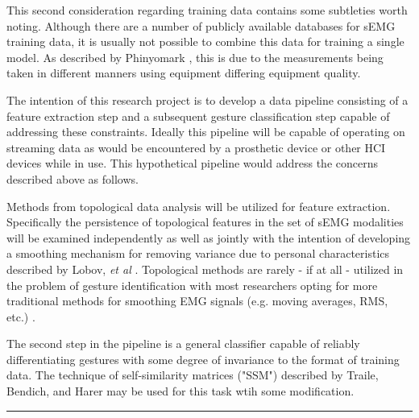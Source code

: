 \documentclass[11pt]{article}
\begin{document}
This second consideration regarding training data contains some subtleties worth noting. Although there are a number of publicly available databases for sEMG training data, it is usually not possible to combine this data for training a single model. As described by Phinyomark \cite{bigdata}, this is due to the measurements being taken in different manners using equipment differing equipment quality.

The intention of this research project is to develop a data pipeline consisting of a feature extraction step and a subsequent gesture classification step capable of addressing these constraints. Ideally this pipeline will be capable of operating on streaming data as would be encountered by a prosthetic device or other HCI devices while in use. This hypothetical pipeline would address the concerns described above as follows.

Methods from topological data analysis will be utilized for feature extraction. Specifically the persistence of topological features in the set of sEMG modalities will be examined independently as well as jointly with the intention of developing a smoothing mechanism for removing variance due to personal characteristics described by Lobov, \emph{et al} \cite{lobov}. Topological methods are rarely - if at all - utilized in the problem of gesture identification with most researchers opting for more traditional methods for smoothing EMG signals (e.g. moving averages, RMS, etc.) \cite{state}.

The second step in the pipeline is a general classifier capable of reliably differentiating gestures with some degree of invariance to the format of training data. The technique of self-similarity matrices ("SSM") described by Traile, Bendich, and Harer may be used for this task wtih some modification\cite{ssm}.

\begin{center}
\noindent\rule{16cm}{0.4pt}
\end{center}
\end{document}

